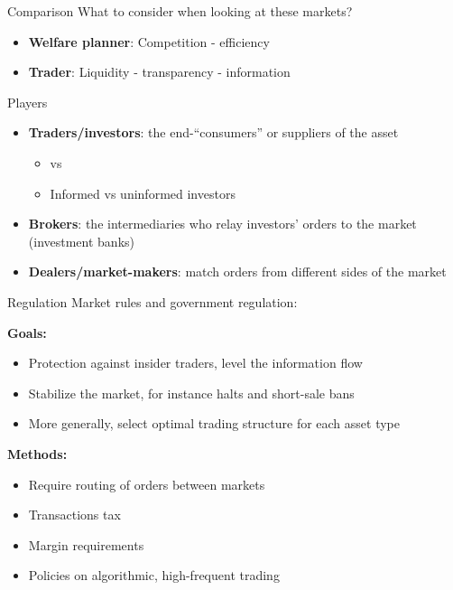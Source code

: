 \documentclass[english,10pt
,aspectratio=169
]{beamer}
\begin{document}
\begin{frame}{Comparison}
	What to consider when looking at these markets?
	\begin{itemize}
		\item \textbf{Welfare planner}: Competition - efficiency 
		\item \textbf{Trader}: Liquidity - transparency - information
	\end{itemize}
\end{frame}


\begin{frame}{Players}
	\begin{itemize}
		\item \textbf{Traders/investors}: the end-``consumers'' or suppliers of the asset
		\begin{itemize}
			\item {} vs 
			\item \alert{Informed} vs \alert{uninformed} investors
		\end{itemize}
		\item \textbf{Brokers}: the intermediaries who relay investors' orders to the market (investment banks)
		\item \textbf{Dealers/market-makers}: match orders from different sides of the market
	\end{itemize}
\end{frame}


\begin{frame}{Regulation}
	Market rules and government regulation:
	
	\textbf{Goals:}
	\begin{itemize}
		\item Protection against insider traders, level the information flow
		\item Stabilize the market, for instance halts and short-sale bans
		\item More generally, select optimal trading structure for each asset type
	\end{itemize}
	\textbf{Methods:}
	\begin{itemize}
		\item Require routing of orders between markets
		\item Transactions tax
		\item Margin requirements
		\item Policies on algorithmic, high-frequent trading
	\end{itemize}
\end{frame}
\end{document}
